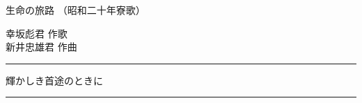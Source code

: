 \documentclass[10pt,b5j]{tarticle} %
\begin{document}
\begin{minipage}[c]{0.7\hsize} %
    \begin{center}
        {\LARGE
            生命の旅路 %
        }
        {\small 
            （昭和二十年寮歌） %
        }
    \end{center}
\end{minipage}
\begin{minipage}[c]{0.3\hsize} %
    \begin{flushright} %
        幸坂彪君 作歌\\新井忠雄君 作曲 %
    \end{flushright}
\end{minipage}
\begin{minipage}[c]{0.7\hsize} %
    \begin{center}
        {\large 
            \rule[0.0em]{1.5em}{0.05em} 輝かしき首途のときに \rule[0.0em]{1.5em}{0.05em}
        }
    \end{center}
\end{minipage}
\end{document}
